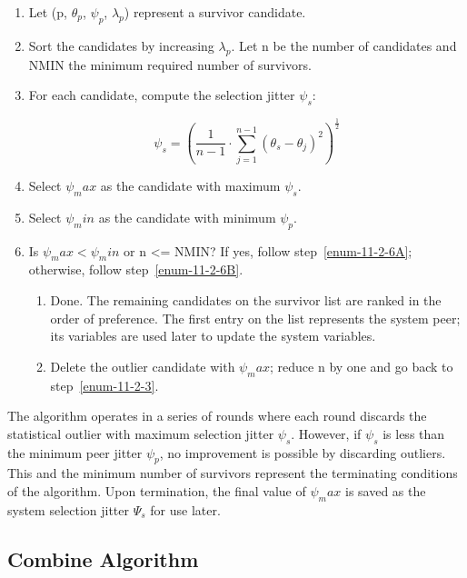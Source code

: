 \begin{enumerate}
  \item Let (p, $ \theta_p $, $ \psi_p $, $ \lambda_p $) represent a survivor candidate.

  \item Sort the candidates by increasing $ \lambda_p $. Let n be the number
    of candidates and NMIN the minimum required number of survivors.

  \item \label{enum-11-2-3} For each candidate, compute the selection jitter $ \psi_s $:

    $$
    \psi_s = \left( \frac{1}{n - 1} \cdot \sum^{n - 1}_{j = 1} (\theta_s - \theta_j)^2 \right)^{\frac{1}{2}}
    $$

  \item Select $ \psi_max $ as the candidate with maximum $ \psi_s $.
  \item Select $ \psi_min $ as the candidate with minimum $ \psi_p $.

  \item \label{enum-11-2-6} Is $ \psi_max < \psi_min $ or n <= NMIN? If yes, follow step~\ref{enum-11-2-6A};
    otherwise, follow step~\ref{enum-11-2-6B}.

    \begin{enumerate}
      \item \label{enum-11-2-6A} Done. The remaining candidates on the survivor list are ranked
      in the order of preference. The first entry on the list represents
      the system peer; its variables are used later to update the system
      variables.

      \item \label{enum-11-2-6B} Delete the outlier candidate with $ \psi_max $; reduce n by one and go
      back to step~\ref{enum-11-2-3}.
    \end{enumerate}
\end{enumerate}

The algorithm operates in a series of rounds where each round
discards the statistical outlier with maximum selection jitter $ \psi_s $.
However, if $ \psi_s $ is less than the minimum peer jitter $ \psi_p $, no
improvement is possible by discarding outliers. This and the minimum
number of survivors represent the terminating conditions of the
algorithm. Upon termination, the final value of $ \psi_max $ is saved as
the system selection jitter $ \Psi_s $ for use later.

\subsection{Combine Algorithm}
\label{section-11-2-3}

